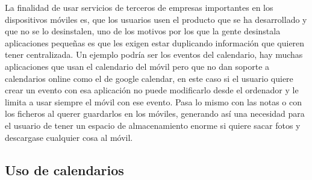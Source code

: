  
La finalidad de usar servicios de terceros de empresas importantes en los dispositivos móviles es, que los usuarios usen el producto que se ha desarrollado y que no se lo desinstalen, uno de los motivos por los que la gente desinstala aplicaciones pequeñas es que les exigen estar duplicando información que quieren tener centralizada. Un ejemplo podría ser los eventos del calendario, hay muchas aplicaciones que usan el calendario del móvil pero que no dan soporte a calendarios online como el de google calendar, en este caso si el usuario quiere crear un evento con esa aplicación no puede modificarlo desde el ordenador y le limita a usar siempre el móvil con ese evento.
Pasa lo mismo con las notas o con los ficheros al querer guardarlos en los móviles, generando así una necesidad para el usuario de tener un espacio de almacenamiento enorme si quiere sacar fotos y descargase cualquier cosa al móvil.

\subsection{Uso de calendarios}
\label{subsecc:Uso de calendarios}

